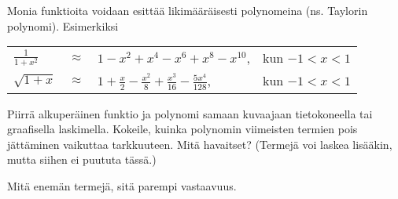 \begin{tehtava}
	Monia funktioita voidaan esittää likimääräisesti polynomeina (ns. Taylorin polynomi). Esimerkiksi

	\begin{tabular}{lcll}
	$\frac{1}{1+x^2}$ &$\approx$ & $1-x^2+x^4-x^6+x^8-x^{10}$, & kun $-1<x<1$ \\
	$\sqrt{1+x}$ & $\approx $ & $ 1+\frac{x}{2}
	-\frac{x^2}{8}+\frac{x^3}{16}-\frac{5x^4}{128}$, & kun $-1<x<1$
	\end{tabular}

	Piirrä alkuperäinen funktio ja polynomi samaan kuvaajaan tietokoneella tai graafisella laskimella. Kokeile, kuinka polynomin viimeisten termien pois jättäminen vaikuttaa tarkkuuteen. Mitä havaitset? (Termejä voi laskea lisääkin, mutta siihen ei puututa tässä.)

	\begin{vastaus}
		Mitä enemän termejä, sitä parempi vastaavuus.
	\end{vastaus}
\end{tehtava}
